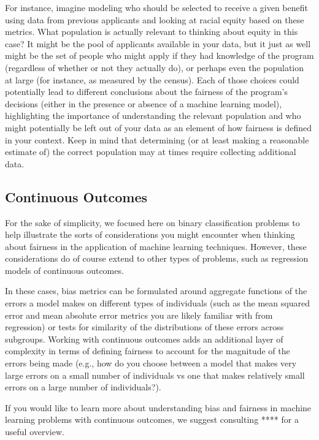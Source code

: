 \documentclass[]{krantz}
\begin{document}
For instance, imagine modeling who should be selected to receive a given
benefit using data from previous applicants and looking at racial equity
based on these metrics. What population is actually relevant to thinking
about equity in this case? It might be the pool of applicants available
in your data, but it just as well might be the set of people who might
apply if they had knowledge of the program (regardless of whether or not
they actually do), or perhaps even the population at large (for
instance, as measured by the census). Each of those choices could
potentially lead to different conclusions about the fairness of the
program's decisions (either in the presence or absence of a machine
learning model), highlighting the importance of understanding the
relevant population and who might potentially be left out of your data
as an element of how fairness is defined in your context. Keep in mind
that determining (or at least making a reasonable estimate of) the
correct population may at times require collecting additional data.

\subsection{Continuous Outcomes}\label{continuous-outcomes}

For the sake of simplicity, we focused here on binary classification
problems to help illustrate the sorts of considerations you might
encounter when thinking about fairness in the application of machine
learning techniques. However, these considerations do of course extend
to other types of problems, such as regression models of continuous
outcomes.

In these cases, bias metrics can be formulated around aggregate
functions of the errors a model makes on different types of individuals
(such as the mean squared error and mean absolute error metrics you are
likely familiar with from regression) or tests for similarity of the
distributions of these errors across subgroups. Working with continuous
outcomes adds an additional layer of complexity in terms of defining
fairness to account for the magnitude of the errors being made (e.g.,
how do you choose between a model that makes very large errors on a
small number of individuals vs one that makes relatively small errors on
a large number of individuals?).

If you would like to learn more about understanding bias and fairness in
machine learning problems with continuous outcomes, we suggest
consulting **** for a useful overview.
\end{document}

